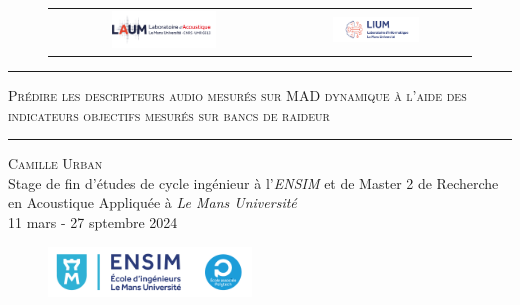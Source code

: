 \begin{titlepage}
\begin{center}

\begingroup

\begin{figure}[htpb!]
    \centering
    \begin{tabular}{c c}
        \includegraphics[width=0.48\textwidth]{Images/0-Logos/logo_laum.png} &
        \includegraphics[width=0.48\textwidth]{Images/0-Logos/logo_lium.png} \\ 
    \end{tabular}
\end{figure}

\endgroup

\vspace{0.5cm}
\rule{\linewidth}{0.3mm}
\vspace{0.5cm}

\LARGE{\textsc{Prédire les descripteurs audio mesurés sur MAD dynamique à l'aide des indicateurs objectifs mesurés sur bancs de raideur}}

\vspace{0.5cm}
\rule{\linewidth}{0.3mm}

\vspace{1cm}

\LARGE{ \textsc{Camille Urban}} \\ [0.7cm]

\Large {Stage de fin d'études de cycle ingénieur à l'\textit{ENSIM} et de Master 2 de Recherche en Acoustique Appliquée à \textit{Le Mans Université}} \\[0.7cm]

11 mars - 27 sptembre 2024 \\ [0.7cm]

\begin{figure}[htpb!]
    \centering
    \includegraphics[width=0.48\textwidth]{Images/0-Logos/LOGO-ensim-couleur-HD.png} 
\end{figure}




\end{center}
\end{titlepage}
